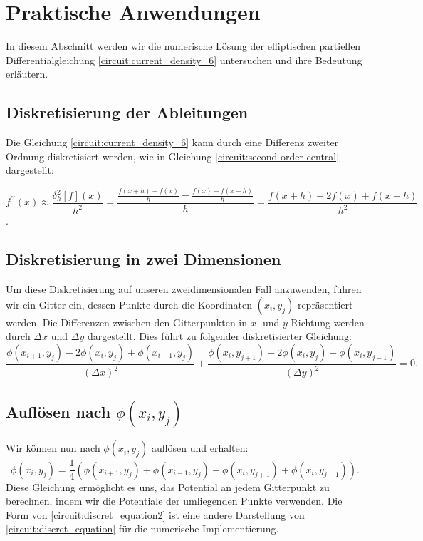 \section{Praktische Anwendungen}
In diesem Abschnitt werden wir die numerische Lösung der elliptischen partiellen Differentialgleichung \eqref{circuit:current_density_6} untersuchen und ihre Bedeutung erläutern.

\subsection{Diskretisierung der Ableitungen} Die Gleichung \eqref{circuit:current_density_6} kann durch eine Differenz zweiter Ordnung diskretisiert werden, wie in Gleichung \eqref{circuit:second-order-central} dargestellt:

\begin{equation}
	f^{\prime \prime}(x) \approx \frac{\delta_h^2[f](x)}{h^2}=\frac{\frac{f(x+h)-f(x)}{h}-\frac{f(x)-f(x-h)}{h}}{h}=\frac{f(x+h)-2 f(x)+f(x-h)}{h^2}
	\label{circuit:second-order-central}
\end{equation}
\cite{enwiki:1220817436}.

\subsection{Diskretisierung in zwei Dimensionen} Um diese Diskretisierung auf unseren zweidimensionalen Fall anzuwenden, führen wir ein Gitter ein, dessen Punkte durch die Koordinaten $(x_i, y_j)$ repräsentiert werden. Die Differenzen zwischen den Gitterpunkten in $x$- und $y$-Richtung werden durch $\Delta x$ und $\Delta y$ dargestellt. Dies führt zu folgender diskretisierter Gleichung:
\begin{equation}
	\frac{\phi(x_{i+1}, y_j) - 2\phi(x_i, y_j) + \phi(x_{i-1}, y_j)}{(\Delta x)^2} + \frac{\phi(x_i, y_{j+1}) - 2\phi(x_i, y_j) + \phi(x_i, y_{j-1})}{(\Delta y)^2} = 0.
	\label{circuit:discret_equation}
\end{equation}

\subsection{Auflösen nach $\phi(x_i, y_j)$} 
Wir können nun nach $\phi(x_i, y_j)$ auflösen und erhalten:
\begin{equation}
	\phi(x_i, y_j) = \frac{1}{4}(\phi(x_{i+1}, y_{j}) + \phi(x_{i-1}, y_{j}) + \phi(x_{i}, y_{j+1}) + \phi(x_{i}, y_{j-1})).
	\label{circuit:discret_equation2}
\end{equation}
Diese Gleichung ermöglicht es uns, das Potential an jedem Gitterpunkt zu berechnen, indem wir die Potentiale der umliegenden Punkte verwenden. Die Form von \eqref{circuit:discret_equation2} ist eine andere Darstellung von \eqref{circuit:discret_equation} für die numerische Implementierung.

